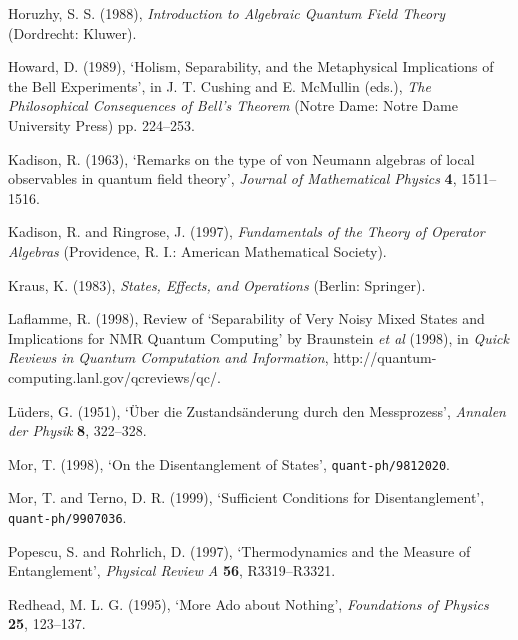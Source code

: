 \documentclass[12pt]{article}
\begin{document}
\noindent Horuzhy, S. S. (1988),
\emph{Introduction to Algebraic Quantum Field Theory} (Dordrecht:
Kluwer).\vspace{.1in}

\noindent Howard, D. (1989), `Holism, Separability, and the 
Metaphysical Implications of the Bell Experiments', in J. T. Cushing 
and E. McMullin (eds.), \emph{The Philosophical Consequences of Bell's 
Theorem} (Notre Dame: Notre Dame University Press) pp. 224--253.\vspace{.1in}

\noindent Kadison, R. (1963),
`Remarks on the type of von Neumann algebras of local observables in
quantum field theory', \emph{Journal of Mathematical Physics} \textbf{4}, 1511--1516.\vspace{.1in}

\noindent Kadison, R. and Ringrose, J. (1997), \emph{Fundamentals of the Theory
of Operator Algebras} (Providence, R. I.: American Mathematical 
Society). \vspace{.1in}

\noindent Kraus, K. (1983), \emph{States, Effects, and Operations} 
(Berlin: Springer).\vspace{.1in}

\noindent Laflamme, R. (1998), Review of `Separability of Very Noisy Mixed States and 
Implications for NMR Quantum Computing' by Braunstein \emph{et al} 
(1998), 
in \emph{Quick Reviews in Quantum Computation and Information}, 
http://quantum-computing.lanl.gov/qcreviews/qc/.\vspace{.1in}

\noindent L\"{u}ders, G. (1951), `\"{U}ber die Zustands\"{a}nderung durch den 
Messprozess', \emph{Annalen der Physik} \textbf{8}, 322--328.\vspace{.1in}

\noindent Mor, T. (1998),
`On the Disentanglement of States', 
{\tt quant-ph/9812020}.\vspace{.1in}

\noindent Mor, T. and Terno, D. R. (1999),
`Sufficient Conditions for Disentanglement', 
{\tt quant-ph/9907036}.\vspace{.1in}

\noindent Popescu, S. and Rohrlich, D. (1997), `Thermodynamics and the Measure of 
Entanglement', \emph{Physical Review A} \textbf{56}, R3319--R3321.\vspace{.1in}

\noindent Redhead, M. L. G. (1995), `More Ado about Nothing',
  \emph{Foundations of Physics} \textbf{25}, 123--137.\vspace{.1in}
  
\end{document}
